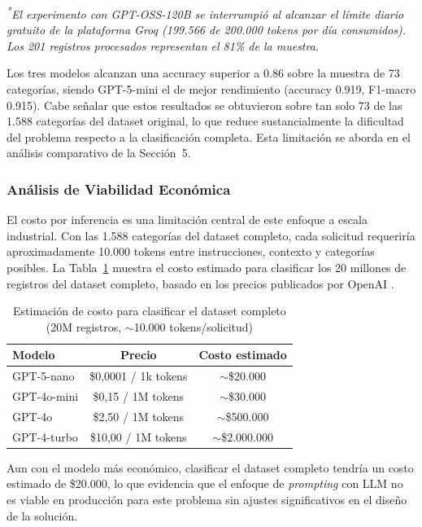 \documentclass[11pt,a4paper]{article}
\begin{document}
\noindent\textit{\textsuperscript{*}El experimento con GPT-OSS-120B se interrumpió al alcanzar el límite diario gratuito de la plataforma Groq (199.566 de 200.000 tokens por día consumidos). Los 201 registros procesados representan el 81\% de la muestra.}

\vspace{0.5em}

Los tres modelos alcanzan una accuracy superior a 0.86 sobre la muestra de 73 categorías, siendo GPT-5-mini el de mejor rendimiento (accuracy 0.919, F1-macro 0.915). Cabe señalar que estos resultados se obtuvieron sobre tan solo 73 de las 1.588 categorías del dataset original, lo que reduce sustancialmente la dificultad del problema respecto a la clasificación completa. Esta limitación se aborda en el análisis comparativo de la Sección~5.

\subsubsection{Análisis de Viabilidad Económica}

El costo por inferencia es una limitación central de este enfoque a escala industrial. Con las 1.588 categorías del dataset completo, cada solicitud requeriría aproximadamente 10.000 tokens entre instrucciones, contexto y categorías posibles. La Tabla~\ref{tab:modelo1-costos} muestra el costo estimado para clasificar los 20 millones de registros del dataset completo, basado en los precios publicados por OpenAI \cite{openai-pricing}.

\begin{table}[H]
\centering
\caption{Estimación de costo para clasificar el dataset completo (20M registros, $\sim$10.000 tokens/solicitud)}
\small
\begin{tabular}{lcc}
\toprule
Modelo & Precio & Costo estimado \\
\midrule
GPT-5-nano  & \$0,0001 / 1k tokens & $\sim$\$20.000 \\
GPT-4o-mini & \$0,15 / 1M tokens   & $\sim$\$30.000 \\
GPT-4o      & \$2,50 / 1M tokens   & $\sim$\$500.000 \\
GPT-4-turbo & \$10,00 / 1M tokens  & $\sim$\$2.000.000 \\
\bottomrule
\end{tabular}
\label{tab:modelo1-costos}
\end{table}

Aun con el modelo más económico, clasificar el dataset completo tendría un costo estimado de \$20.000, lo que evidencia que el enfoque de \emph{prompting} con LLM no es viable en producción para este problema sin ajustes significativos en el diseño de la solución.
\end{document}
